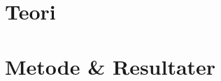 \documentclass[12pt,twoside,onecolumn,norsk]{article}
\begin{document}

\newpage\null\newpage


\newpage\null


\newpage\null
{} 
\part{Teori}

\newpage


\newpage\null


\newpage\null
\part{Metode \& Resultater}

\newpage


\newpage\null


\newpage\null


\newpage\null

\newpage\null

\newpage\null

\newpage\null\thispagestyle{empty}\newpage
\end{document}
